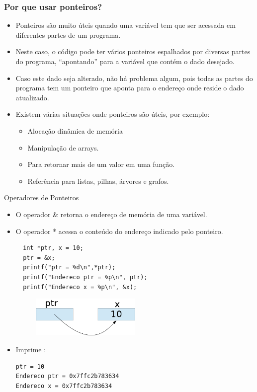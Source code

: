 \documentclass[aspectratio=169]{beamer}
\begin{document}
\begin{frame}
\frametitle{Por que usar ponteiros?}
\begin{itemize}
\item Ponteiros são muito úteis quando uma variável tem que ser acessada em diferentes partes de um programa.
\item Neste caso, o código pode ter vários ponteiros espalhados por diversas partes do programa, ``apontando'' para a variável que contém o dado desejado.
\item Caso este dado seja alterado, não há problema algum, pois todas as partes do programa tem um ponteiro que aponta para o endereço onde reside o dado atualizado.
\item Existem várias situações onde ponteiros são úteis, por exemplo:
\begin{itemize}
\item Alocação dinâmica de memória
\item Manipulação de arrays.
\item Para retornar mais de um valor em uma função.
\item Referência para listas, pilhas, árvores e grafos.
\end{itemize}
\end{itemize}
\end{frame}


\begin{frame}[fragile]{Operadores de Ponteiros}
\begin{itemize}
\item O operador \& retorna o endereço de memória de uma variável.
\item O operador * acessa o conteúdo do endereço indicado pelo ponteiro.
\begin{lstlisting}
  int *ptr, x = 10;
  ptr = &x;
  printf("ptr = %d\n",*ptr);
  printf("Endereco ptr = %p\n", ptr);
  printf("Endereco x = %p\n", &x);
\end{lstlisting} 

\begin{figure}[!ht]
  \centering
  \includegraphics[width=150pt]{imgs/ponteiro.png}
\end{figure}
\item Imprime :
\begin{verbatim}
ptr = 10
Endereco ptr = 0x7ffc2b783634
Endereco x = 0x7ffc2b783634
\end{verbatim}
\end{itemize}
\end{frame}
\end{document}

